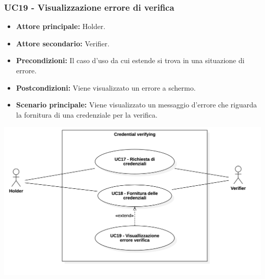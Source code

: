 \subsubsection{UC19 - Visualizzazione errore di verifica}
\begin{itemize}
    \item \textbf{Attore principale:} Holder.
    \item \textbf{Attore secondario:} Verifier.
    \item \textbf{Precondizioni:} Il caso d'uso da cui estende si trova in una situazione di errore.
    \item \textbf{Postcondizioni:} Viene visualizzato un errore a schermo. 
    \item \textbf{Scenario principale:} Viene visualizzato un messaggio d’errore che riguarda la fornitura di una credenziale per la verifica.
\end{itemize}

\begin{center}
    \includegraphics[scale = 0.32]{./res/img/CredentialVerifying.png}
  \end{center}